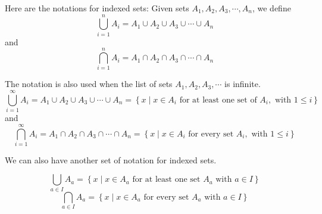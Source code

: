 Here are the notations for indexed sets:
Given sets $A_1, A_2, A_3, \cdots, A_n$, we define 
\begin{equation*}
    \bigcup_{i = 1}^{n} A_i = A_1 \cup A_2 \cup A_3 \cup \cdots \cup A_n
\end{equation*}
and 
\begin{equation*}
    \bigcap_{i = 1}^{n} A_i = A_1 \cap A_2 \cap A_3 \cap \cdots \cap A_n
\end{equation*}

The notation is also used when the list of sets $A_1, A_2, A_3, \cdots$ is infinite. 
\begin{equation*}
    \bigcup_{i = 1}^{\infty} A_i = A_1 \cup A_2 \cup A_3 \cup \cdots \cup A_n
    =
    \left\{
        x \mid x \in A_i \text{ for at least one set of } A_i, \text{ with } 1 \leq i
    \right\}
\end{equation*}
and 
\begin{equation*}
    \bigcap_{i = 1}^{\infty} A_i = A_1 \cap A_2 \cap A_3 \cap \cdots \cap A_n
     =
    \left\{
        x \mid x \in A_i \text{ for every set } A_i, \text{ with } 1 \leq i
    \right\}
\end{equation*}

We can also have another set of notation for indexed sets. 
\begin{definition}
    \[
        \bigcup_{a \in I} A_a = \left\{
            x \mid x \in A_a \text{ for at least one set } A_a \text{ with } a \in I
        \right\}
    \]
    \[
        \bigcap_{a \in I} A_a = \left\{
            x \mid x \in A_a \text{ for every set } A_a \text{ with } a \in I
        \right\}
    \]
\end{definition}